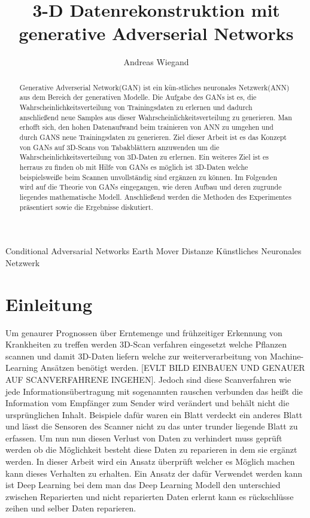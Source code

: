 \documentclass{llncs}
\begin{document}
	\tableofcontents
	\begin{acronym}[Bash]
		Conditional Adversarial Networks
		 Earth Mover Distanze
		 Künstliches Neuronales Netzwerk
	\end{acronym}
	\title{3-D Datenrekonstruktion mit generative Adverserial Networks}
	\author{Andreas Wiegand}
	\maketitle								%
	\begin{abstract}		
		Generative Adverserial Network(GAN) ist ein kün-stliches neuronales Netzwerk(ANN) aus dem Bereich der generativen Modelle. Die Aufgabe des GANs ist es, die Wahrscheinlichkeitsverteilung von Trainingsdaten zu erlernen und dadurch anschließend neue Samples aus dieser Wahrscheinlichkeitsverteilung zu generieren. Man erhofft sich, den hohen Datenaufwand beim trainieren von ANN zu umgehen und durch GANS neue Trainingsdaten zu generieren. Ziel dieser Arbeit ist es das Konzept von GANs auf 3D-Scans von Tabakblättern anzuwenden um die Wahrscheinlichkeitsverteilung von 3D-Daten zu erlernen. Ein weiteres Ziel ist es herraus zu finden ob mit Hilfe von GANs es möglich ist 3D-Daten welche beispielsweiße beim Scannen unvollständig sind ergänzen zu können. Im Folgenden wird auf die Theorie von GANs eingegangen, wie deren Aufbau und deren zugrunde liegendes mathematische Modell. Anschließend werden die Methoden des Experimentes präsentiert sowie die Ergebnisse diskutiert.  
	\end{abstract}
	\section{Einleitung}%
	
	Um genaurer Prognossen über Erntemenge und frühzeitiger Erkennung von Krankheiten zu treffen werden 3D-Scan verfahren eingesetzt welche Pflanzen scannen und damit 3D-Daten liefern welche zur weiterverarbeitung von Machine-Learning Ansätzen benötigt werden. [EVLT BILD EINBAUEN UND GENAUER AUF SCANVERFAHRENE INGEHEN]. Jedoch sind diese Scanverfahren wie jede Informationsübertragung mit sogenannten rauschen verbunden das heißt die Information vom Empfänger zum Sender wird verändert und behält nicht die ursprünglichen Inhalt. Beispiele dafür waren ein Blatt verdeckt ein anderes Blatt und lässt die Sensoren des Scanner nicht zu das unter trunder liegende Blatt zu erfassen. Um nun nun diesen Verlust von Daten zu verhindert muss geprüft werden ob die Möglichkeit besteht diese Daten zu reparieren in dem sie ergänzt werden. In dieser Arbeit wird ein Ansatz überprüft welcher es Möglich machen kann dieses Verhalten zu erhalten.  Ein Ansatz der dafür Verwendet werden kann ist Deep Learning bei dem man das Deep Learning Modell den unterschied zwischen Reparierten und nicht reparierten Daten erlernt kann es rückschlüsse zeihen und selber Daten reparieren.
	\\
	
\end{document}
